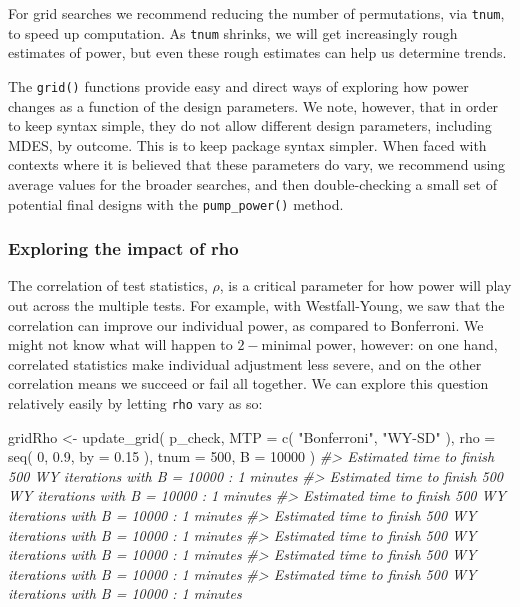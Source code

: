 \documentclass[
]{article}
\newenvironment{Shaded}{\begin{snugshade}}{\end{snugshade}}
\newcommand{\AttributeTok}[1]{\textcolor[rgb]{0.77,0.63,0.00}{#1}}
\newcommand{\CommentTok}[1]{\textcolor[rgb]{0.56,0.35,0.01}{\textit{#1}}}
\newcommand{\DecValTok}[1]{\textcolor[rgb]{0.00,0.00,0.81}{#1}}
\newcommand{\FloatTok}[1]{\textcolor[rgb]{0.00,0.00,0.81}{#1}}
\newcommand{\FunctionTok}[1]{\textcolor[rgb]{0.00,0.00,0.00}{#1}}
\newcommand{\NormalTok}[1]{#1}
\newcommand{\OtherTok}[1]{\textcolor[rgb]{0.56,0.35,0.01}{#1}}
\newcommand{\StringTok}[1]{\textcolor[rgb]{0.31,0.60,0.02}{#1}}
\begin{document}
For grid searches we recommend reducing the number of permutations, via
\texttt{tnum}, to speed up computation. As \texttt{tnum} shrinks, we
will get increasingly rough estimates of power, but even these rough
estimates can help us determine trends.

The \texttt{grid()} functions provide easy and direct ways of exploring
how power changes as a function of the design parameters. We note,
however, that in order to keep syntax simple, they do not allow
different design parameters, including MDES, by outcome. This is to keep
package syntax simpler. When faced with contexts where it is believed
that these parameters do vary, we recommend using average values for the
broader searches, and then double-checking a small set of potential
final designs with the \texttt{pump\_power()} method.

\subsubsection{Exploring the impact of rho}

The correlation of test statistics, \(\rho\), is a critical parameter
for how power will play out across the multiple tests. For example, with
Westfall-Young, we saw that the correlation can improve our individual
power, as compared to Bonferroni. We might not know what will happen to
\(2-\)minimal power, however: on one hand, correlated statistics make
individual adjustment less severe, and on the other correlation means we
succeed or fail all together. We can explore this question relatively
easily by letting \texttt{rho} vary as so:

\begin{Shaded}
\begin{Highlighting}[]
\NormalTok{gridRho }\OtherTok{\textless{}{-}} \FunctionTok{update\_grid}\NormalTok{( p\_check,}
              \AttributeTok{MTP =} \FunctionTok{c}\NormalTok{( }\StringTok{"Bonferroni"}\NormalTok{, }\StringTok{"WY{-}SD"}\NormalTok{ ),}
              \AttributeTok{rho =} \FunctionTok{seq}\NormalTok{( }\DecValTok{0}\NormalTok{, }\FloatTok{0.9}\NormalTok{, }\AttributeTok{by =} \FloatTok{0.15}\NormalTok{ ),}
              \AttributeTok{tnum =} \DecValTok{500}\NormalTok{,}
              \AttributeTok{B =} \DecValTok{10000}\NormalTok{ )}
\CommentTok{\#\textgreater{} Estimated time to finish 500 WY iterations with B = 10000 : 1 minutes}
\CommentTok{\#\textgreater{} Estimated time to finish 500 WY iterations with B = 10000 : 1 minutes}
\CommentTok{\#\textgreater{} Estimated time to finish 500 WY iterations with B = 10000 : 1 minutes}
\CommentTok{\#\textgreater{} Estimated time to finish 500 WY iterations with B = 10000 : 1 minutes}
\CommentTok{\#\textgreater{} Estimated time to finish 500 WY iterations with B = 10000 : 1 minutes}
\CommentTok{\#\textgreater{} Estimated time to finish 500 WY iterations with B = 10000 : 1 minutes}
\CommentTok{\#\textgreater{} Estimated time to finish 500 WY iterations with B = 10000 : 1 minutes}
\end{Highlighting}
\end{Shaded}
\end{document}
